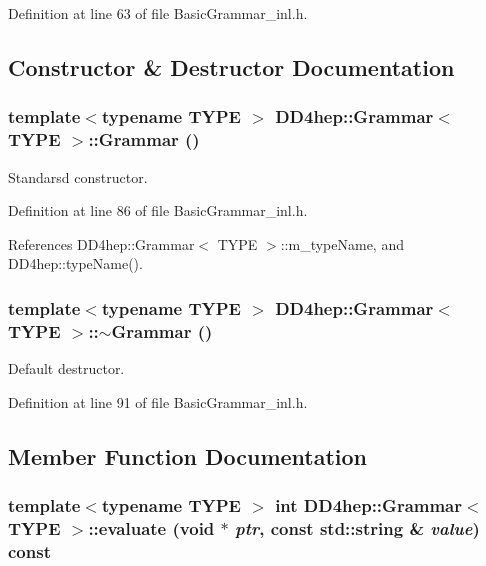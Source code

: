 Definition at line 63 of file BasicGrammar\_\-inl.h.

\subsection{Constructor \& Destructor Documentation}
\hypertarget{class_d_d4hep_1_1_grammar_a38672ae640c8b5a7e36af4084878f74a}{
\subsubsection[{Grammar}]{\setlength{\rightskip}{0pt plus 5cm}template$<$typename TYPE $>$ {\bf DD4hep::Grammar}$<$ TYPE $>$::{\bf Grammar} ()}}
\label{class_d_d4hep_1_1_grammar_a38672ae640c8b5a7e36af4084878f74a}


Standarsd constructor. 

Definition at line 86 of file BasicGrammar\_\-inl.h.

References DD4hep::Grammar$<$ TYPE $>$::m\_\-typeName, and DD4hep::typeName().\hypertarget{class_d_d4hep_1_1_grammar_a53982c366a911db255f51de19d9ce9ef}{
\subsubsection[{$\sim$Grammar}]{\setlength{\rightskip}{0pt plus 5cm}template$<$typename TYPE $>$ {\bf DD4hep::Grammar}$<$ TYPE $>$::$\sim${\bf Grammar} ()}}
\label{class_d_d4hep_1_1_grammar_a53982c366a911db255f51de19d9ce9ef}


Default destructor. 

Definition at line 91 of file BasicGrammar\_\-inl.h.

\subsection{Member Function Documentation}
\hypertarget{class_d_d4hep_1_1_grammar_a794aaf9d5b05a13ad4d62870cba5865e}{
\subsubsection[{evaluate}]{\setlength{\rightskip}{0pt plus 5cm}template$<$typename TYPE $>$ int {\bf DD4hep::Grammar}$<$ TYPE $>$::evaluate (void $\ast$ {\em ptr}, \/  const std::string \& {\em value}) const}}
\label{class_d_d4hep_1_1_grammar_a794aaf9d5b05a13ad4d62870cba5865e}


